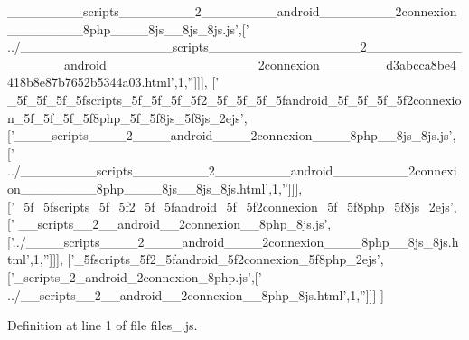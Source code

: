 \begin{DoxyCode}
{      \_\_\_\_\_\_\_\_scripts\_\_\_\_\_\_\_\_2\_\_\_\_\_\_\_\_android\_\_\_\_\_\_\_\_2connexion\_\_\_\_\_\_\_\_8php\_\_\_\_8js\_\_8js\_8js.js'},[\textcolor{stringliteral}{'
      ../\_\_\_\_\_\_\_\_\_\_\_\_\_\_\_\_scripts\_\_\_\_\_\_\_\_\_\_\_\_\_\_\_\_2\_\_\_\_\_\_\_\_\_\_\_\_\_\_\_\_android\_\_\_\_\_\_\_\_\_\_\_\_\_\_\_\_2connexion\_\_\_\_\_\_\_d3abcca8be4418b8e87b7652b5344a03.html'},1,\textcolor{stringliteral}{''}]]],
  [\textcolor{stringliteral}{'
      \_5f\_5f\_5f\_5fscripts\_5f\_5f\_5f\_5f2\_5f\_5f\_5f\_5fandroid\_5f\_5f\_5f\_5f2connexion\_5f\_5f\_5f\_5f8php\_5f\_5f8js\_5f8js\_2ejs'},[\textcolor{stringliteral}{'\_\_\_\_scripts\_\_\_\_2\_\_\_\_android\_\_\_\_2connexion\_\_\_\_8php\_\_8js\_8js.js'},[\textcolor{stringliteral}{'
      ../\_\_\_\_\_\_\_\_scripts\_\_\_\_\_\_\_\_2\_\_\_\_\_\_\_\_android\_\_\_\_\_\_\_\_2connexion\_\_\_\_\_\_\_\_8php\_\_\_\_8js\_\_8js\_8js.html'},1,\textcolor{stringliteral}{''}]]],
  [\textcolor{stringliteral}{'\_5f\_5fscripts\_5f\_5f2\_5f\_5fandroid\_5f\_5f2connexion\_5f\_5f8php\_5f8js\_2ejs'},[\textcolor{stringliteral}{'
      \_\_scripts\_\_2\_\_android\_\_2connexion\_\_8php\_8js.js'},[\textcolor{stringliteral}{'../\_\_\_\_scripts\_\_\_\_2\_\_\_\_android\_\_\_\_2connexion\_\_\_\_8php\_\_8js\_8js.html'},1,\textcolor{stringliteral}{''}]]],
  [\textcolor{stringliteral}{'\_5fscripts\_5f2\_5fandroid\_5f2connexion\_5f8php\_2ejs'},[\textcolor{stringliteral}{'\_scripts\_2\_android\_2connexion\_8php.js'},[\textcolor{stringliteral}{'
      ../\_\_scripts\_\_2\_\_android\_\_2connexion\_\_8php\_8js.html'},1,\textcolor{stringliteral}{''}]]]
]
\end{DoxyCode}


Definition at line 1 of file files\+\_.\+js.

